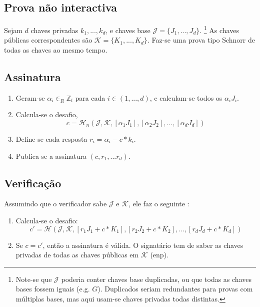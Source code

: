 \subsection*{Prova não interactiva}

Sejam $d$ chaves privadas $k_1,...,k_d$, e chaves base $\mathcal{J} = \{J_1,...,J_d\}$.
\footnote{Note-se que $\mathcal{J}$ poderia conter chaves base duplicadas, ou que todas as chaves bases fossem iguais (e.g. $G$). Duplicados seriam redundantes para provas com múltiplas bases, mas aqui usam-se chaves privadas todas distintas.} 
As chaves públicas correspondentes são $\mathcal{K} = \{K_1,...,K_d\}$. Faz-se uma prova tipo Schnorr de todas as chaves ao mesmo tempo.  

\subsection*{Assinatura}
\begin{enumerate}
	\item Geram-se $\alpha_i \in_R \mathbb{Z}_l$ para cada $i \in (1,...,d)$, e calculam-se todos os $\alpha_i J_i$.
	\item Calcula-se o desafio,\vspace{.175cm}
	\[c = \mathcal{H}_n(\mathcal{J},\mathcal{K},[\alpha_1 J_1],[\alpha_2 J_2],...,[\alpha_d J_d])\]
	\item Define-se cada resposta $r_i = \alpha_i - c*k_i$.
	\item Publica-se a assinatura $(c, r_1,...r_d)$.
\end{enumerate}

\subsection*{Verificação}

Assumindo que o verificador sabe $\mathcal{J}$ e $\mathcal{K}$, ele faz o seguinte :

\begin{enumerate}
	\item Calcula-se o desafio:\vspace{.175cm}
	\[c' = \mathcal{H}(\mathcal{J},\mathcal{K},[r_1 J_1 + c*K_1],[r_2 J_2 + c*K_2],...,[r_d J_d + c*K_d])\]
	\item Se $c = c'$, então a assinatura é válida. O signatário tem de saber as chaves privadas de todas as chaves públicas em $\mathcal{K}$ (enp).
\end{enumerate}

